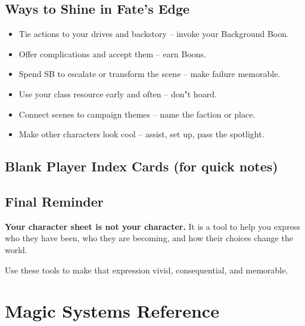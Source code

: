 \subsection{Ways to Shine in Fate's Edge}

\begin{itemize}
    \item Tie actions to your drives and backstory -- invoke your Background Boon.
    \item Offer complications and accept them -- earn Boons.
    \item Spend SB to escalate or transform the scene -- make failure memorable.
    \item Use your class resource early and often -- don"t hoard.
    \item Connect scenes to campaign themes -- name the faction or place.
    \item Make other characters look cool -- assist, set up, pass the spotlight.
\end{itemize}

\subsection{Blank Player Index Cards (for quick notes)}

\begin{center}
\end{center}

\begin{center}
\end{center}

\subsection{Final Reminder}

\textbf{Your character sheet is not your character.}  
It is a tool to help you express who they have been, who they are becoming, and how their choices change the world.

Use these tools to make that expression vivid, consequential, and memorable.

\clearpage

\section{Magic Systems Reference}
\label{app:magic-ref}


